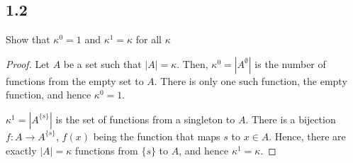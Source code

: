 \subsection*{1.2} Show that $\kappa^0=1$ and $\kappa^1=\kappa$ for all $\kappa$

\begin{proof}
Let $A$ be a set such that $|A| = \kappa$. Then, $\kappa^0 = |A^\emptyset|$ is the number of functions from the empty set to $A$. There is only one such function, the empty function, and hence $\kappa^0 = 1$.

$\kappa^1 = |A^{\{s\}}|$ is the set of functions from a singleton to $A$. There is a bijection $f:A \rightarrow A^{\{s\}}$, $f(x)$ being the function that maps $s$ to $x \in A$. Hence, there are exactly $|A| = \kappa$ functions from $\{s\}$ to $A$, and hence $\kappa^1 = \kappa$.
\end{proof}

